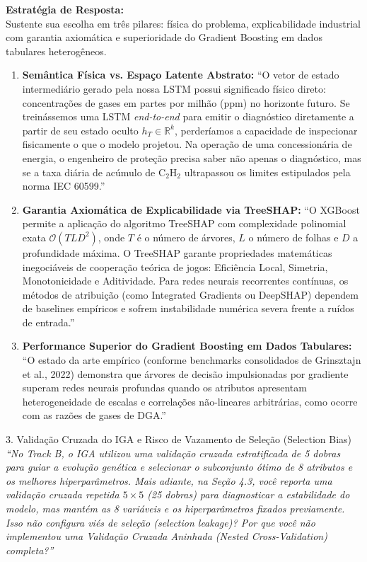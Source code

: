 \documentclass[11pt,a4paper]{article}
\begin{document}
\begin{boardAnswer}
\textbf{Estratégia de Resposta:}\\
Sustente sua escolha em três pilares: física do problema, explicabilidade industrial com garantia axiomática e superioridade do Gradient Boosting em dados tabulares heterogêneos.

\begin{enumerate}[leftmargin=0.8cm]
  \item \textbf{Semântica Física vs. Espaço Latente Abstrato:} ``O vetor de estado intermediário gerado pela nossa LSTM possui significado físico direto: concentrações de gases em partes por milhão (ppm) no horizonte futuro. Se treinássemos uma LSTM \textit{end-to-end} para emitir o diagnóstico diretamente a partir de seu estado oculto $h_T \in \mathbb{R}^k$, perderíamos a capacidade de inspecionar fisicamente o que o modelo projetou. Na operação de uma concessionária de energia, o engenheiro de proteção precisa saber não apenas o diagnóstico, mas se a taxa diária de acúmulo de $\text{C}_2\text{H}_2$ ultrapassou os limites estipulados pela norma IEC 60599.''
  \item \textbf{Garantia Axiomática de Explicabilidade via TreeSHAP:} ``O XGBoost permite a aplicação do algoritmo TreeSHAP com complexidade polinomial exata $\mathcal{O}(T L D^2)$, onde $T$ é o número de árvores, $L$ o número de folhas e $D$ a profundidade máxima. O TreeSHAP garante propriedades matemáticas inegociáveis de cooperação teórica de jogos: Eficiência Local, Simetria, Monotonicidade e Aditividade. Para redes neurais recorrentes contínuas, os métodos de atribuição (como Integrated Gradients ou DeepSHAP) dependem de baselines empíricos e sofrem instabilidade numérica severa frente a ruídos de entrada.''
  \item \textbf{Performance Superior do Gradient Boosting em Dados Tabulares:} ``O estado da arte empírico (conforme benchmarks consolidados de Grinsztajn et al., 2022) demonstra que árvores de decisão impulsionadas por gradiente superam redes neurais profundas quando os atributos apresentam heterogeneidade de escalas e correlações não-lineares arbitrárias, como ocorre com as razões de gases de DGA.''
\end{enumerate}
\end{boardAnswer}

\begin{boardQuestion}{3. Validação Cruzada do IGA e Risco de Vazamento de Seleção (Selection Bias)}
\textit{“No Track B, o IGA utilizou uma validação cruzada estratificada de 5 dobras para guiar a evolução genética e selecionar o subconjunto ótimo de 8 atributos e os melhores hiperparâmetros. Mais adiante, na Seção 4.3, você reporta uma validação cruzada repetida $5 \times 5$ (25 dobras) para diagnosticar a estabilidade do modelo, mas mantém as 8 variáveis e os hiperparâmetros fixados previamente. Isso não configura viés de seleção (selection leakage)? Por que você não implementou uma Validação Cruzada Aninhada (Nested Cross-Validation) completa?”}
\end{boardQuestion}
\end{document}
